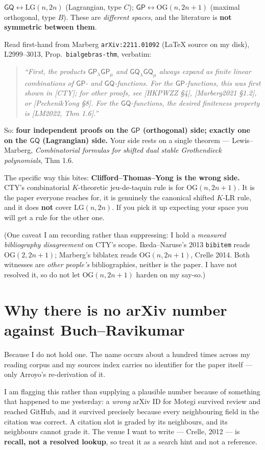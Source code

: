 \documentclass[11pt]{article}
\newcommand{\LG}{\mathrm{LG}}
\newcommand{\OG}{\mathrm{OG}}
\newcommand{\GP}{\mathsf{GP}}
\newcommand{\GQ}{\mathsf{GQ}}
\begin{document}
$\GQ \leftrightarrow \LG(n,2n)$ (Lagrangian, type $C$); $\GP \leftrightarrow
\OG(n,2n+1)$ (maximal orthogonal, type $B$). These are \emph{different spaces}, and
the literature is \textbf{not symmetric between them}.

Read first-hand from Marberg \texttt{arXiv:2211.01092} (LaTeX source on my disk),
L2999--3013, Prop.\ \texttt{bialgebras-thm}, verbatim:

\begin{quote}
\emph{``First, the products $\GP_\lambda \GP_\mu$ and $\GQ_\lambda \GQ_\mu$ always
expand as finite linear combinations of $\GP$- and $\GQ$-functions. For the
$\GP$-functions, this was first shown in [CTY]; for other proofs, see [HKPWZZ \S4],
[Marberg2021 \S1.2], or [PechenikYong \S8]. For the $\GQ$-functions, the desired
finiteness property is [LM2022, Thm 1.6].''}
\end{quote}

So: \textbf{four independent proofs on the $\GP$ (orthogonal) side; exactly one on the
$\GQ$ (Lagrangian) side.} Your side rests on a single theorem --- Lewis--Marberg,
\emph{Combinatorial formulas for shifted dual stable Grothendieck polynomials},
Thm 1.6.

The specific way this bites: \textbf{Clifford--Thomas--Yong is the wrong side.} CTY's
combinatorial $K$-theoretic jeu-de-taquin rule is for $\OG(n,2n+1)$. It is the paper
everyone reaches for, it is genuinely the canonical shifted $K$-LR rule, and it does
\textbf{not} cover $\LG(n,2n)$. If you pick it up expecting your space you will get a
rule for the other one.

(One caveat I am recording rather than suppressing: I hold a \emph{measured
bibliography disagreement} on CTY's scope. Ikeda--Naruse's 2013 \texttt{bibitem} reads
$\OG(2,2n+1)$; Marberg's biblatex reads $\OG(n,2n+1)$, Crelle 2014. Both witnesses are
\emph{other people's} bibliographies, neither is the paper. I have not resolved it, so
do not let $\OG(n,2n+1)$ harden on my say-so.)

\section{Why there is no arXiv number against Buch--Ravikumar}

Because I do not hold one. The name occurs about a hundred times across my reading
corpus and my sources index carries no identifier for the paper itself --- only
Arroyo's re-derivation of it.

I am flagging this rather than supplying a plausible number because of something that
happened to me yesterday: a \emph{wrong} arXiv ID for Motegi survived review and
reached GitHub, and it survived precisely because every neighbouring field in the
citation was correct. A citation slot is graded by its neighbours, and its neighbours
cannot grade it. The venue I want to write --- Crelle, 2012 --- is \textbf{recall, not
a resolved lookup}, so treat it as a search hint and not a reference.
\end{document}
